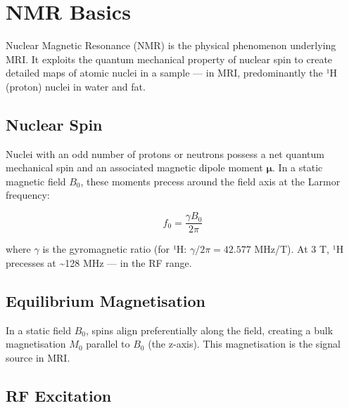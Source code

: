 \section{NMR Basics}\label{sec:wiki_nmr_basics}



Nuclear Magnetic Resonance (NMR) is the physical phenomenon underlying MRI. It exploits the quantum mechanical property of nuclear spin to create detailed maps of atomic nuclei in a sample — in MRI, predominantly the ¹H (proton) nuclei in water and fat.

				

\subsection{Nuclear Spin}

				

Nuclei with an odd number of protons or neutrons possess a net quantum mechanical spin and an associated magnetic dipole moment $\boldsymbol{\mu}$. In a static magnetic field $B_0$, these moments precess around the field axis at the Larmor frequency:


				
\[f_0 = \dfrac{\gamma B_0}{2\pi}\]

				

where $\gamma$ is the gyromagnetic ratio (for ¹H: $\gamma/2\pi = 42.577$ MHz/T). At 3 T, ¹H precesses at \textasciitilde{}128 MHz — in the RF range.

				

\subsection{Equilibrium Magnetisation}

				

In a static field $B_0$, spins align preferentially along the field, creating a bulk magnetisation $M_0$ parallel to $B_0$ (the z-axis). This magnetisation is the signal source in MRI.

				

\subsection{RF Excitation}

